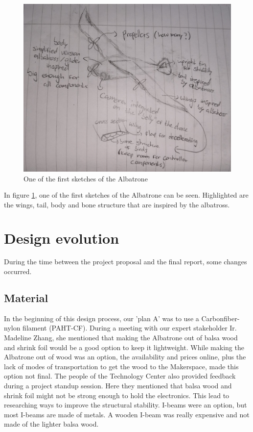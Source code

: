 \begin{figure}
     \centering
     \includegraphics[width=0.5\linewidth]{images/Sketch.jpg}
     \caption{One of the first sketches of the Albatrone}
     \label{fig:Sketch Albatrone}
 \end{figure}

 In figure \ref{fig:Sketch Albatrone}, one of the first sketches of the Albatrone can be seen. Highlighted are the wings, tail, body and bone structure that are inspired by the albatross. \\

 

\section{Design evolution} 

During the time between the project proposal and the final report, some changes occurred. 

 

\subsection{Material} 
In the beginning of this design process, our 'plan A' was to use a Carbonfiber-nylon filament (PAHT-CF). During a meeting with our expert stakeholder Ir. Madeline Zhang, she mentioned that making the Albatrone out of balsa wood and shrink foil would be a good option to keep it lightweight. While making the Albatrone out of wood was an option, the availability and prices online, plus the lack of modes of transportation to get the wood to the Makerspace, made this option not final. The people of the Technology Center also provided feedback during a project standup session. Here they mentioned that balsa wood and shrink foil might not be strong enough to hold the electronics. This lead to researching ways to improve the structural stability. I-beams were an option, but most I-beams are made of metals. A wooden I-beam was really expensive and not made of the lighter balsa wood.

